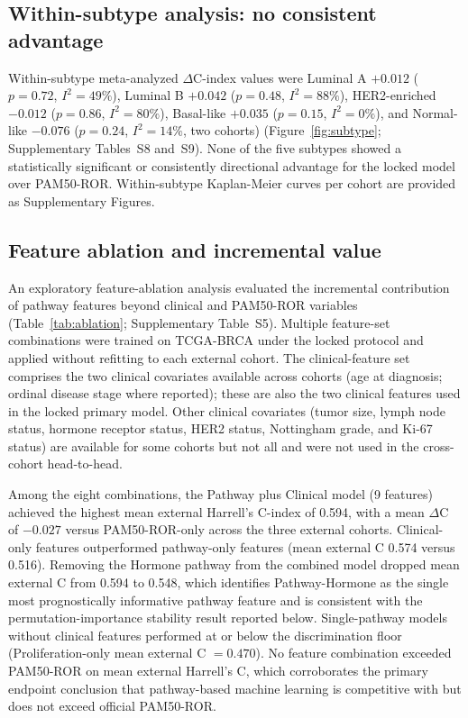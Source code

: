 \documentclass[11pt,letterpaper]{article}
\begin{document}
\subsection*{Within-subtype analysis: no consistent advantage}

Within-subtype meta-analyzed $\Delta$C-index values were Luminal A $+0.012$ ($p = 0.72$, $I^2 = 49\%$), Luminal B $+0.042$ ($p = 0.48$, $I^2 = 88\%$), HER2-enriched $-0.012$ ($p = 0.86$, $I^2 = 80\%$), Basal-like $+0.035$ ($p = 0.15$, $I^2 = 0\%$), and Normal-like $-0.076$ ($p = 0.24$, $I^2 = 14\%$, two cohorts) (Figure~\ref{fig:subtype}; Supplementary Tables~S8 and~S9). None of the five subtypes showed a statistically significant or consistently directional advantage for the locked model over PAM50-ROR. Within-subtype Kaplan-Meier curves per cohort are provided as Supplementary Figures.

\subsection*{Feature ablation and incremental value}

An exploratory feature-ablation analysis evaluated the incremental contribution of pathway features beyond clinical and PAM50-ROR variables (Table~\ref{tab:ablation}; Supplementary Table~S5). Multiple feature-set combinations were trained on TCGA-BRCA under the locked protocol and applied without refitting to each external cohort. The clinical-feature set comprises the two clinical covariates available across cohorts (age at diagnosis; ordinal disease stage where reported); these are also the two clinical features used in the locked primary model. Other clinical covariates (tumor size, lymph node status, hormone receptor status, HER2 status, Nottingham grade, and Ki-67 status) are available for some cohorts but not all and were not used in the cross-cohort head-to-head.

Among the eight combinations, the Pathway plus Clinical model (9 features) achieved the highest mean external Harrell's C-index of 0.594, with a mean $\Delta$C of $-0.027$ versus PAM50-ROR-only across the three external cohorts. Clinical-only features outperformed pathway-only features (mean external C 0.574 versus 0.516). Removing the Hormone pathway from the combined model dropped mean external C from 0.594 to 0.548, which identifies Pathway-Hormone as the single most prognostically informative pathway feature and is consistent with the permutation-importance stability result reported below. Single-pathway models without clinical features performed at or below the discrimination floor (Proliferation-only mean external C $= 0.470$). No feature combination exceeded PAM50-ROR on mean external Harrell's C, which corroborates the primary endpoint conclusion that pathway-based machine learning is competitive with but does not exceed official PAM50-ROR.
\end{document}
